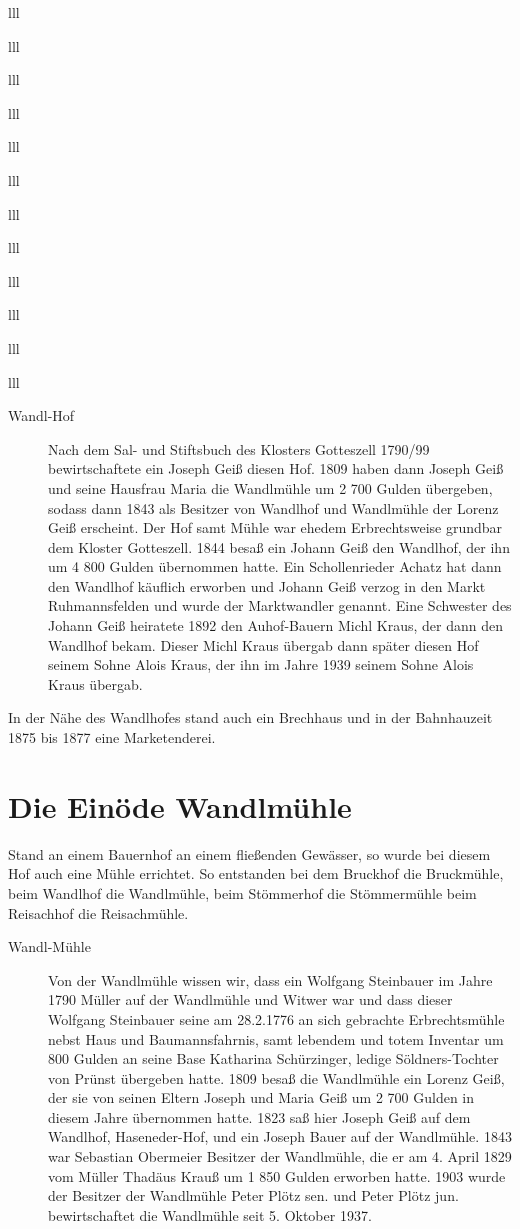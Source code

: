 \documentclass[12pt,a4pager]{book}
\begin{document}
\begin{tabuluar}{lll}
\begin{tabuluar}{lll}
\begin{tabuluar}{lll}
\begin{tabuluar}{lll}
\begin{tabuluar}{lll}
\begin{tabuluar}{lll}
\begin{tabuluar}{lll}
\begin{tabuluar}{lll}
\begin{tabuluar}{lll}
\begin{tabuluar}{lll}
\begin{tabuluar}{lll}
\begin{tabuluar}{lll}
\begin{description}
\item[Wandl-Hof] Nach dem Sal- und Stiftsbuch des Klosters Gotteszell 1790/99
bewirtschaftete ein Joseph Geiß diesen Hof. 1809 haben dann Joseph Geiß und
seine Hausfrau Maria die Wandlmühle um 2 700 Gulden übergeben, sodass dann 1843
als Besitzer von Wandlhof und Wandlmühle der Lorenz Geiß erscheint. Der Hof samt
Mühle war ehedem Erbrechtsweise grundbar dem Kloster Gotteszell. 1844 besaß ein
Johann Geiß den Wandlhof, der ihn um 4 800 Gulden übernommen hatte. Ein
Schollenrieder Achatz hat dann den Wandlhof käuflich erworben und Johann Geiß
verzog in den Markt Ruhmannsfelden und wurde der Marktwandler genannt. Eine
Schwester des Johann Geiß heiratete 1892 den Auhof-Bauern Michl Kraus, der dann
den Wandlhof bekam. Dieser Michl Kraus übergab dann später diesen Hof seinem
Sohne Alois Kraus, der ihn im Jahre 1939 seinem Sohne Alois Kraus übergab.
\end{description}

In der Nähe des Wandlhofes stand auch ein Brechhaus und in der Bahnhauzeit 1875
bis 1877 eine Marketenderei.

\section{Die Einöde Wandlmühle}

Stand an einem Bauernhof an einem fließenden Gewässer, so wurde bei diesem Hof
auch eine Mühle errichtet. So entstanden bei dem Bruckhof die Bruckmühle, beim
Wandlhof die Wandlmühle, beim Stömmerhof die Stömmermühle beim Reisachhof die
Reisachmühle.

\begin{description}
\item[Wandl-Mühle] Von der Wandlmühle wissen wir, dass ein Wolfgang Steinbauer im
Jahre 1790 Müller auf der Wandlmühle und Witwer war und dass dieser Wolfgang
Steinbauer seine am 28.2.1776 an sich gebrachte Erbrechtsmühle nebst Haus und
Baumannsfahrnis, samt lebendem und totem Inventar um 800 Gulden an seine Base
Katharina Schürzinger, ledige Söldners-Tochter von Prünst übergeben hatte. 1809
besaß die Wandlmühle ein Lorenz Geiß, der sie von seinen Eltern Joseph und Maria
Geiß um 2 700 Gulden in diesem Jahre übernommen hatte. 1823 saß hier Joseph Geiß
auf dem Wandlhof, Haseneder-Hof, und ein Joseph Bauer auf der Wandlmühle. 1843
war Sebastian Obermeier Besitzer der Wandlmühle, die er am 4. April 1829 vom
Müller Thadäus Krauß um 1 850 Gulden erworben hatte. 1903 wurde der Besitzer der
Wandlmühle Peter Plötz sen. und Peter Plötz jun. bewirtschaftet die Wandlmühle
seit 5. Oktober 1937.
\end{description}


\end{tabuluar}
\end{tabuluar}
\end{tabuluar}
\end{tabuluar}
\end{tabuluar}
\end{tabuluar}
\end{tabuluar}
\end{tabuluar}
\end{tabuluar}
\end{tabuluar}
\end{tabuluar}
\end{tabuluar}
\end{document}
